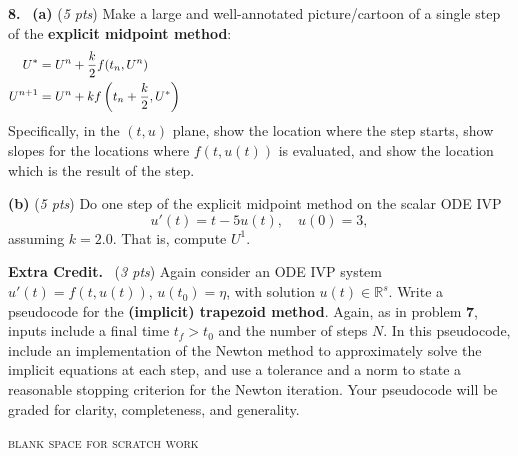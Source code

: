 \documentclass[11pt]{amsart}
\newcommand{\RR}{{\mathbb{R}}}
\newcommand{\prob}[1]{\bigskip\noindent \textbf{#1.}~}
\newcommand{\pts}[1]{(\emph{#1 pts})}
\newcommand{\probpts}[2]{\prob{#1} \pts{#2} \quad}
\newcommand{\ppartpts}[2]{\textbf{(#1)} \pts{#2} \quad}
\newcommand{\epartpts}[2]{\medskip\noindent \textbf{(#1)} \pts{#2} \quad}
\begin{document}
\newpage
\prob{8}  \ppartpts{a}{5}  Make a large and well-annotated picture/cartoon of a single step of the \textbf{explicit midpoint method}:
\begin{align*}
U^* &= U^n + \frac{k}{2} f(t_n,U^n) \hspace{4.0in} \\
U^{n+1} &= U^n + k f\left(t_n+\frac{k}{2},U^*\right)
\end{align*}
Specifically, in the $(t,u)$ plane, show the location where the step starts, show slopes for the locations where $f(t,u(t))$ is evaluated, and show the location which is the result of the step.
\vfill

\epartpts{b}{5}  Do one step of the explicit midpoint method on the scalar ODE IVP
    $$u'(t) = t - 5 u(t), \quad u(0) = 3,$$
assuming $k=2.0$.  That is, compute $U^1$.
\vfill


\newpage
\probpts{Extra Credit}{3}  Again consider an ODE IVP system $u'(t) = f(t, u(t))$, $u(t_0)=\eta$, with solution $u(t) \in \RR^s$.  Write a pseudocode for the \textbf{(implicit) trapezoid method}.  Again, as in problem \textbf{7}, inputs include a final time $t_f>t_0$ and the number of steps $N$.  In this pseudocode, include an implementation of the Newton method to approximately solve the implicit equations at each step, and use a tolerance and a norm to state a reasonable stopping criterion for the Newton iteration.  Your pseudocode will be graded for clarity, completeness, and generality.
\vfill


\newpage
\bigskip
\hrulefill
\begin{center}
{\footnotesize
\textsc{blank space for scratch work}
}
\end{center}
\vfill
\end{document}
